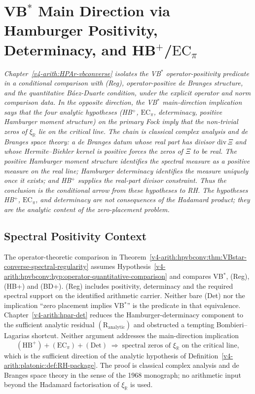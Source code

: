 \chapter[VB\(^{*}\) Main Direction via Hamburger Positivity, Determinacy, and HB\(^{+}\)/\(\mathrm{EC}_\pi\)][Spectral positivity]{VB\(^{*}\) Main Direction via Hamburger Positivity, Determinacy, and HB\(^{+}\)/\(\mathrm{EC}_\pi\)}
\label{v4-arith:w5-j:VBstar-spectral-positivity}

\emph{Chapter~\ref{v4-arith:HPAr-vbconverse} isolates the VB\(^{*}\)
operator-positivity predicate in a conditional comparison with
(Reg), operator-positive de Branges structure, and the quantitative
B\'aez-Duarte condition, under the explicit operator and norm
comparison data. In the opposite direction, the VB\(^{*}\)
main-direction implication says that the four analytic hypotheses
(HB\(^{+}\), \(\mathrm{EC}_\pi\), determinacy, positive Hamburger
moment structure) on the primary Fock imply that the non-trivial zeros
of \(\xi_{\mathbb R}\) lie on the critical line. The chain is classical
complex analysis and de Branges space theory: a de Branges datum
whose real part has divisor \(\mathrm{div}\,\Xi\) and whose
Hermite--Biehler kernel is positive forces the zeros of \(\Xi\) to be
real. The positive
Hamburger moment structure identifies the spectral
measure as a positive measure on the real line; Hamburger
determinacy identifies the measure uniquely once it exists; and
HB\(^{+}\) supplies the real-part divisor constraint. Thus
the conclusion is the conditional arrow from these hypotheses to
RH. The hypotheses
HB\(^{+}\), \(\mathrm{EC}_\pi\), and determinacy are not consequences of the
Hadamard product; they are the analytic content of the
zero-placement problem.}

\section{Spectral Positivity Context}
\label{v4-arith:w5-j:context}

The operator-theoretic comparison in
Theorem~\ref{v4-arith:hpvbconv:thm:VBstar-converse-spectral-regularity}
assumes Hypothesis~\ref{v4-arith:hpvbconv:hyp:operator-quantitative-comparison}
and compares VB\(^{*}\), (Reg), (HB+) and (BD+).
(Reg) includes positivity, determinacy and the required spectral
support on the identified arithmetic carrier. Neither bare
(Det) nor the implication ``zero placement implies VB\(^{*}\)''
is the predicate in that equivalence.
Chapter~\ref{v4-arith:hpar-det} reduces the
Hamburger-determinacy component to the sufficient analytic
residual \((\mathrm{R}_{\mathrm{analytic}})\) and obstructed a tempting
Bombieri--Lagarias shortcut. Neither argument addresses the
main-direction implication
\[
(\mathrm{HB}^{+})+(\mathrm{EC}_\pi)+(\mathrm{Det})
\;\Longrightarrow\;
\text{spectral zeros of \(\xi_{\mathbb R}\) on the critical line},
\]
which is the sufficient direction of the analytic hypothesis of
Definition~\ref{v4-arith:platonic:def:RH-package}. The proof is classical
complex analysis and
de Branges space theory in the sense of the 1968 monograph;
no arithmetic input beyond the Hadamard factorisation of
\(\xi_{\mathbb R}\) is used.

